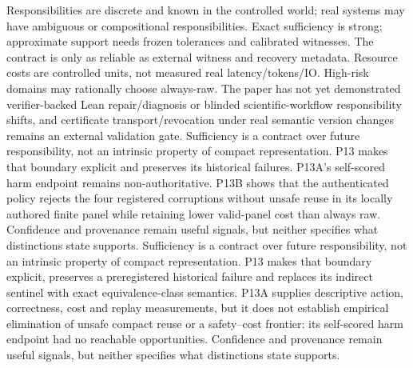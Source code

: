 \markdownRendererDocumentBegin
\markdownRendererSectionBegin
{}\markdownRendererInterblockSeparator
{}Responsibilities are discrete and known in the controlled world; real systems may have ambiguous or compositional responsibilities. Exact sufficiency is strong; approximate support needs frozen tolerances and calibrated witnesses. The contract is only as reliable as external witness and recovery metadata. Resource costs are controlled units, not measured real latency/tokens/IO. High-risk domains may rationally choose always-raw. The paper has not yet demonstrated verifier-backed Lean repair/diagnosis or blinded scientific-workflow responsibility shifts, and certificate transport/revocation under real semantic version changes remains an external validation gate.\markdownRendererInterblockSeparator
{}Sufficiency is a contract over future responsibility, not an intrinsic property of compact representation. P13 makes that boundary explicit and preserves its historical failures. P13A's self-scored harm endpoint remains non-authoritative. P13B shows that the authenticated policy rejects the four registered corruptions without unsafe reuse in its locally authored finite panel while retaining lower valid-panel cost than always raw. Confidence and provenance remain useful signals, but neither specifies what distinctions state supports.\markdownRendererInterblockSeparator
{}
{}Sufficiency is a contract over future responsibility, not an intrinsic property of compact representation. P13 makes that boundary explicit, preserves a preregistered historical failure and replaces its indirect sentinel with exact equivalence-class semantics. P13A supplies descriptive action, correctness, cost and replay measurements, but it does not establish empirical elimination of unsafe compact reuse or a safety–cost frontier: its self-scored harm endpoint had no reachable opportunities. Confidence and provenance remain useful signals, but neither specifies what distinctions state supports.\markdownRendererInterblockSeparator
{}
\markdownRendererSectionEnd \markdownRendererDocumentEnd